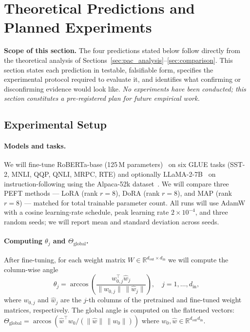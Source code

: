 \documentclass[11pt]{article}
\newcommand{\R}{\mathbb{R}}
\begin{document}
\section{Theoretical Predictions and Planned Experiments}
\label{sec:experiments}

\noindent\textbf{Scope of this section.}
The four predictions stated below follow directly from the theoretical
analysis of Sections~\ref{sec:pac_analysis}--\ref{sec:comparison}.
This section states each prediction in testable, falsifiable form,
specifies the experimental protocol required to evaluate it, and
identifies what confirming or disconfirming evidence would look like.
\emph{No experiments have been conducted; this section constitutes a
pre-registered plan for future empirical work.}

\subsection{Experimental Setup}
\label{sec:exp_setup}

\paragraph{Models and tasks.}
We will fine-tune RoBERTa-base (125\,M parameters)~\cite{liu2019roberta}
on six GLUE tasks (SST-2, MNLI, QQP, QNLI, MRPC, RTE) and optionally
LLaMA-2-7B~\cite{touvron2023llama} on instruction-following using the
Alpaca-52k dataset~\cite{alpaca2023}.
We will compare three PEFT methods --- LoRA (rank $r = 8$), DoRA
(rank $r = 8$), and MAP (rank $r = 8$) --- matched for total trainable
parameter count.
All runs will use AdamW with a cosine learning-rate schedule, peak
learning rate $2 \times 10^{-4}$, and three random seeds; we will report
mean and standard deviation across seeds.

\paragraph{Computing $\theta_j$ and $\Theta_{\mathrm{global}}$.}
After fine-tuning, for each weight matrix $W \in \R^{d_{\mathrm{out}}
\times d_{\mathrm{in}}}$ we will compute the column-wise angle
\[
  \theta_j = \arccos\!\left(
    \frac{w_{0,j}^\top \hat{w}_j}{\|w_{0,j}\|\,\|\hat{w}_j\|}
  \right), \quad j = 1, \ldots, d_{\mathrm{in}},
\]
where $w_{0,j}$ and $\hat{w}_j$ are the $j$-th columns of the
pretrained and fine-tuned weight matrices, respectively.
The global angle is computed on the flattened vectors:
$\Theta_{\mathrm{global}} = \arccos(\hat{w}^\top w_0 /
(\|\hat{w}\|\,\|w_0\|))$ where $w_0, \hat{w} \in \R^{d_{\mathrm{out}}
d_{\mathrm{in}}}$.
\end{document}

